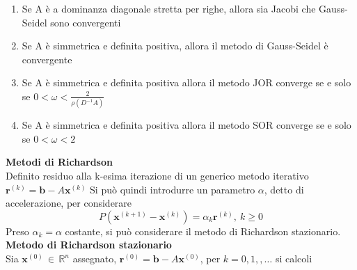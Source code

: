 \documentclass[a4paper,12pt]{article}
\begin{document}
\begin{enumerate}

\item Se A è a dominanza diagonale stretta per righe, allora sia Jacobi che Gauss-Seidel sono convergenti
\item Se A è simmetrica e definita positiva, allora il metodo di Gauss-Seidel è convergente
\item Se A è simmetrica e definita positiva allora il metodo JOR converge se e solo se $0 < \omega < \frac{2}{\rho(D^{-1}A)}$
\item Se A è simmetrica e definita positiva allora il metodo SOR converge se e solo se $0 < \omega < 2$

\end{enumerate} 
\textbf{Metodi di Richardson} \\
Definito residuo alla k-esima iterazione di un generico metodo iterativo $\textbf{r}^{(k)} =  \textbf{b} - A\textbf{x}^{(k)}$
Si può quindi introdurre un parametro $\alpha$, detto di accelerazione, per considerare $$P(\textbf{x}^{(k+1)} - \textbf{x}^{(k)}) = \alpha_{k}\textbf{r}^{(k)}, \ k \geq 0$$
Preso $\alpha_{k} = \alpha$ costante, si può considerare il metodo di Richardson stazionario. \\
\textbf{Metodo di Richardson stazionario} \\
Sia $\textbf{x}^{(0)} \, \in \, \mathbb{R}^{n}$ assegnato, $\textbf{r}^{(0)} = \textbf{b} - A\textbf{x}^{(0)}$, per $k = 0, 1, ,\ldots $ si calcoli 
\end{document}
